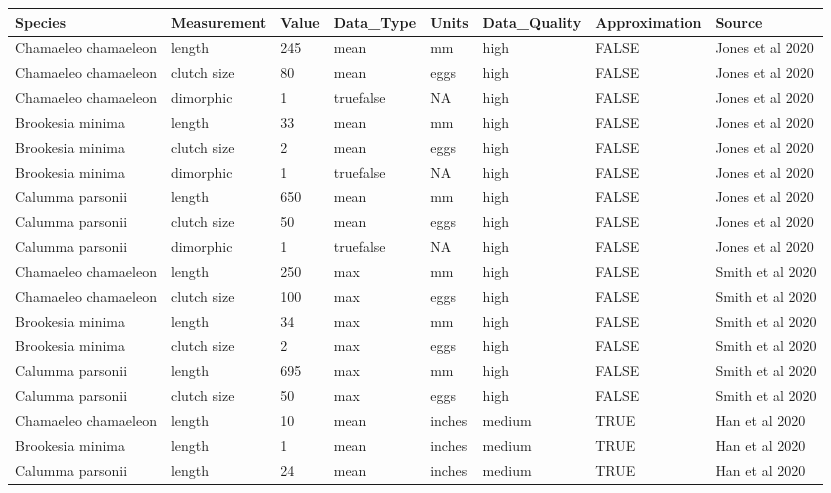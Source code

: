 \documentclass[]{book}
\begin{document}
\begin{tabular}{l|l|l|l|l|l|l|l}
\hline
Species & Measurement & Value & Data\_Type & Units & Data\_Quality & Approximation & Source\\
\hline
Chamaeleo chamaeleon & length & 245 & mean & mm & high & FALSE & Jones et al 2020\\
\hline
Chamaeleo chamaeleon & clutch size & 80 & mean & eggs & high & FALSE & Jones et al 2020\\
\hline
Chamaeleo chamaeleon & dimorphic & 1 & truefalse & NA & high & FALSE & Jones et al 2020\\
\hline
Brookesia minima & length & 33 & mean & mm & high & FALSE & Jones et al 2020\\
\hline
Brookesia minima & clutch size & 2 & mean & eggs & high & FALSE & Jones et al 2020\\
\hline
Brookesia minima & dimorphic & 1 & truefalse & NA & high & FALSE & Jones et al 2020\\
\hline
Calumma parsonii & length & 650 & mean & mm & high & FALSE & Jones et al 2020\\
\hline
Calumma parsonii & clutch size & 50 & mean & eggs & high & FALSE & Jones et al 2020\\
\hline
Calumma parsonii & dimorphic & 1 & truefalse & NA & high & FALSE & Jones et al 2020\\
\hline
Chamaeleo chamaeleon & length & 250 & max & mm & high & FALSE & Smith et al 2020\\
\hline
Chamaeleo chamaeleon & clutch size & 100 & max & eggs & high & FALSE & Smith et al 2020\\
\hline
Brookesia minima & length & 34 & max & mm & high & FALSE & Smith et al 2020\\
\hline
Brookesia minima & clutch size & 2 & max & eggs & high & FALSE & Smith et al 2020\\
\hline
Calumma parsonii & length & 695 & max & mm & high & FALSE & Smith et al 2020\\
\hline
Calumma parsonii & clutch size & 50 & max & eggs & high & FALSE & Smith et al 2020\\
\hline
Chamaeleo chamaeleon & length & 10 & mean & inches & medium & TRUE & Han et al 2020\\
\hline
Brookesia minima & length & 1 & mean & inches & medium & TRUE & Han et al 2020\\
\hline
Calumma parsonii & length & 24 & mean & inches & medium & TRUE & Han et al 2020\\
\hline
\end{tabular}
\end{document}
